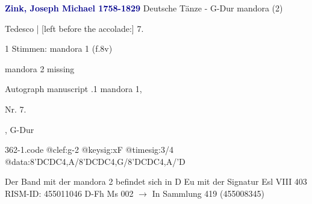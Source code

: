 \documentclass[twocolumn]{book}
\begin{document}
\newline \par \vspace{7pt} \textcolor{darkblue}{\textbf{Zink, Joseph Michael  1758-1829}}
\newline Deutsche Tänze - G-Dur
\newline mandora (2)
\newline \begin{itshape}[f.8v, at left:] Tedesco | [left before the accolade:] 7.\end{itshape} 
\newline \textcolor{darkblue}{}  1 Stimmen: mandora 1  (f.8v)
\newline \begin{small} mandora 2 missing\end{small} 
\newline Autograph manuscript
.1  mandora 1, \begin{itshape}Nr. 7.\end{itshape}, G-Dur  
\begin{filecontents*}{362-1.code}
@clef:g-2
@keysig:xF
@timesig:3/4
@data:8'DCDC4,A/8'DCDC4,G/8'DCDC4,A/'D
\end{filecontents*}
\newline
%
\newline Der Band mit der mandora 2 befindet sich in D Eu mit der Signatur Esl VIII 403
\newline RISM-ID: 455011046
\newline D-Fh  Ms 002
\newline $\rightarrow$ In Sammlung 419 (455008345)
      
\end{document}
